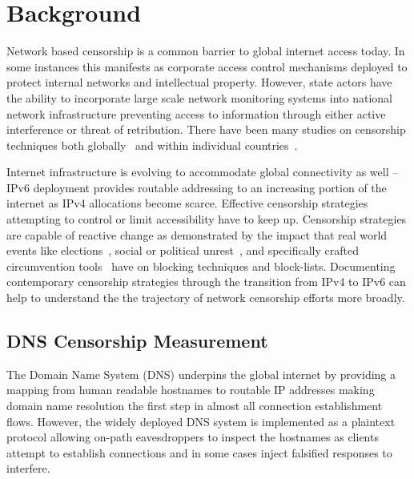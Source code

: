 \section{Background}\label{sec:background}


Network based censorship is a common barrier to global internet access today.
In some instances this manifests as corporate access control mechanisms deployed
to protect internal networks and intellectual property. However,
state actors have the ability to incorporate large scale network monitoring
systems into national network infrastructure preventing access to information
through either active interference or threat of retribution. There
have been many studies on censorship techniques both
globally~\cite{pearce2017global,niaki2020iclab,scott2016satellite,sundara2020censored,filasto2012ooni,pearce2017augur}
and within individual countries~\cite{USESEC21:GFWatch,aryan2013internet,ramesh2020decentralized,yadav2018light,gebhart2017internet,nabi2013anatomy}.

Internet infrastructure is evolving to accommodate global connectivity as well
-- IPv6 deployment provides routable addressing to an increasing portion of the
internet as IPv4 allocations become scarce. Effective censorship strategies
attempting to control or limit accessibility have to keep up.
Censorship strategies are capable of reactive change as demonstrated by
the impact that real world events like elections~\cite{aryan2013internet},
social or political unrest~\cite{shandler2018measuring,padmanabhan2021multi},
and specifically crafted circumvention tools~\cite{beznazwy2020china}
have on blocking techniques and block-lists. Documenting contemporary censorship
strategies through the transition from IPv4 to IPv6 can help to understand the
the trajectory of network censorship efforts more broadly.


\subsection{DNS Censorship Measurement}

\FigDNSCensorship

The Domain Name System (DNS) underpins the global internet by providing a
mapping from human readable hostnames to routable IP addresses making domain name
resolution the first step in almost all connection establishment flows. However,
the widely deployed DNS system is implemented as a plaintext protocol allowing
on-path eavesdroppers to inspect the hostnames as clients attempt to establish
connections and in some cases inject falsified responses to interfere.

